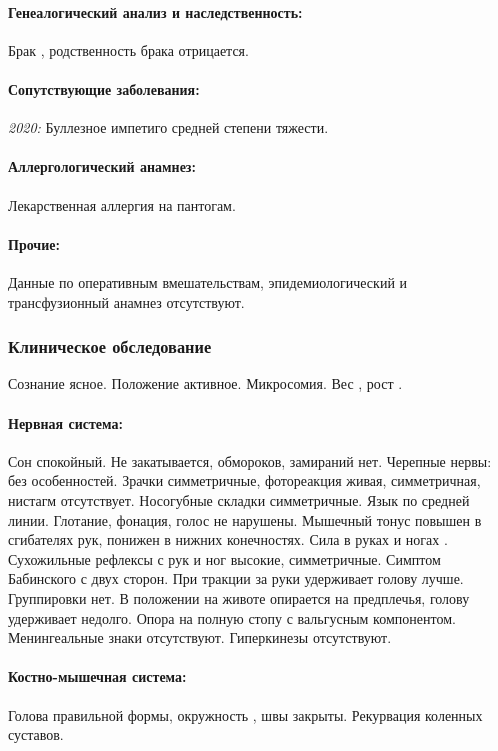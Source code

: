 \documentclass[a4paper,14pt]{extarticle}
\newcommand{\kilogramm}{кг}
\newcommand{\cm}{см}
\newcommand{\pdate}[1]{\emph{#1:} }
\begin{document}
\paragraph{Генеалогический анализ и наследственность:} Брак , родственность брака отрицается.

\paragraph{Сопутствующие заболевания:} \pdate{2020} Буллезное импетиго средней степени тяжести.

\paragraph{Аллергологический анамнез:} Лекарственная аллергия на пантогам.

\paragraph{Прочие:} Данные по оперативным вмешательствам, эпидемиологический и трансфузионный анамнез отсутствуют.

\subsubsection*{Клиническое обследование}

Сознание ясное. Положение активное. Микросомия. Вес \numprint[\kilogramm]{6}, рост \numprint[\cm]{68}.

\paragraph{Нервная система:} Сон спокойный. Не закатывается, обмороков, замираний нет. Черепные нервы: без особенностей. Зрачки симметричные, фотореакция живая, симметричная, нистагм отсутствует. Носогубные складки симметричные. Язык по средней линии. Глотание, фонация, голос не нарушены. Мышечный тонус повышен в сгибателях рук, понижен в нижних конечностях. Сила в руках и ногах . Сухожильные рефлексы с рук и ног высокие, симметричные. Симптом Бабинского с двух сторон. При тракции за руки удерживает голову лучше. Группировки нет. В положении на животе опирается на предплечья, голову удерживает недолго. Опора на полную стопу с вальгусным компонентом. Менингеальные знаки отсутствуют. Гиперкинезы отсутствуют.

\paragraph{Костно-мышечная система:} Голова правильной формы, окружность \numprint[\cm]{41}, швы закрыты. Рекурвация коленных суставов.
\end{document}
